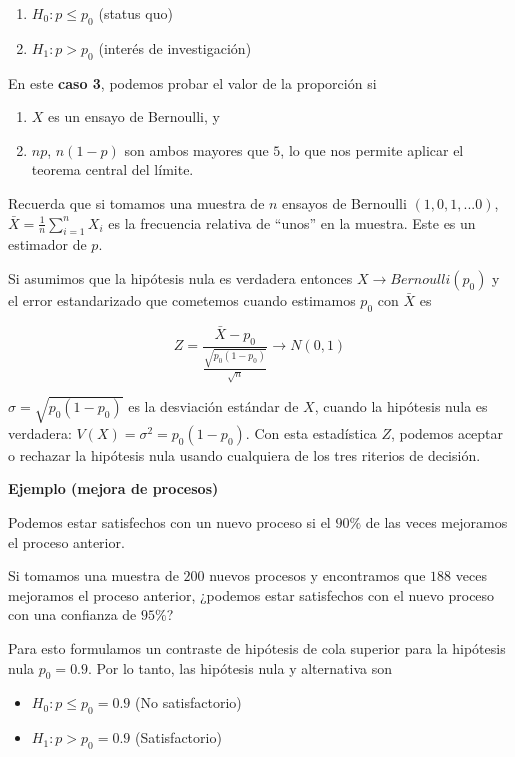 \documentclass[
]{book}
\providecommand{\tightlist}{%
  \setlength{\itemsep}{0pt}\setlength{\parskip}{0pt}}
\begin{document}
\begin{enumerate}
\def\labelenumi{\alph{enumi}.}
\tightlist
\item
  \(H_0: p \leq p_0\) (status quo)
\item
  \(H_1: p> p_0\) (interés de investigación)
\end{enumerate}

En este \textbf{caso 3}, podemos probar el valor de la proporción si

\begin{enumerate}
\def\labelenumi{\arabic{enumi}.}
\tightlist
\item
  \(X\) es un ensayo de Bernoulli, y
\item
  \(np\), \(n(1-p)\) son ambos mayores que \(5\), lo que nos permite aplicar el teorema central del límite.
\end{enumerate}

Recuerda que si tomamos una muestra de \(n\) ensayos de Bernoulli \((1,0,1,...0)\), \(\bar{X}=\frac{1}{n}\sum_{i=1 }^n X_i\) es la frecuencia relativa de ``unos'' en la muestra. Este es un estimador de \(p\).

Si asumimos que la hipótesis nula es verdadera entonces \(X \rightarrow Bernoulli(p_0)\) y el error estandarizado que cometemos cuando estimamos \(p_0\) con \(\bar{X}\) es

\[Z=\frac{\bar{X}-p_0}{\frac{\sqrt{p_0(1-p_0)}}{\sqrt{n}}} \rightarrow N(0,1)\]

\(\sigma=\sqrt{p_0(1-p_0)}\) es la desviación estándar de \(X\), cuando la hipótesis nula es verdadera: \(V(X)=\sigma^2=p_0(1-p_0)\). Con esta estadística \(Z\), podemos aceptar o rechazar la hipótesis nula usando cualquiera de los tres riterios de decisión.

\textbf{Ejemplo (mejora de procesos)}

Podemos estar satisfechos con un nuevo proceso si el \(90\%\) de las veces mejoramos el proceso anterior.

Si tomamos una muestra de \(200\) nuevos procesos y encontramos que \(188\) veces mejoramos el proceso anterior, ¿podemos estar satisfechos con el nuevo proceso con una confianza de \(95\%\)?

Para esto formulamos un contraste de hipótesis de cola superior para la hipótesis nula \(p_0=0.9\). Por lo tanto, las hipótesis nula y alternativa son

\begin{itemize}
\tightlist
\item
  \(H_0: p \leq p_0=0.9\) (No satisfactorio)
\item
  \(H_1: p> p_0=0.9\) (Satisfactorio)
\end{itemize}
\end{document}
